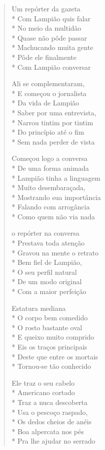 \begin{verse}
Um repórter da gazeta\\*
Com Lampião quis falar\\*
No meio da multidão\\*
Quase não pôde passar\\*
Machucando muita gente\\*
Pôde ele finalmente\\*
Com Lampião conversar

Ali se complementaram,\\*
E começou o jornalista\\*
Da vida de Lampião\\*
Saber por uma entrevista,\\*
Narrou tintim por tintim\\*
Do princípio até o fim\\*
Sem nada perder de vista

Começou logo a conversa\\*
De uma forma animada\\*
Lampião tinha a linguagem\\*
Muito desembaraçada,\\*
Mostrando sua importância\\*
Falando com arrogância\\*
Como quem não via nada

o repórter na conversa\\*
Prestava toda atenção\\*
Gravou na mente o retrato\\*
Bem fiel de Lampião,\\*
O seu perfil natural\\*
De um modo original\\*
Com a maior perfeição

Estatura mediana\\*
O corpo bem comedido\\*
O rosto bastante oval\\*
E queixo muito comprido\\*
Eis os traços principais\\*
Deste que entre os mortais\\*
Tornou-se tão conhecido

Ele traz o seu cabelo\\*
Americano cortado\\*
Traz a nuca descoberta\\*
Usa o pescoço raspado,\\*
Os dedos cheios de anéis\\*
Boa alpercata nos pés\\*
Pra lhe ajudar no serrado


\end{verse}
